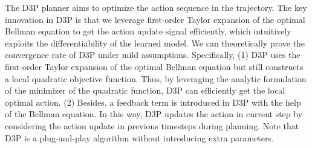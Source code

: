 \documentclass{article} %
\begin{document}
The D3P planner aims to optimize the action sequence in the trajectory. The key innovation in D3P is that we leverage first-order Taylor expansion of the optimal Bellman equation to get the action update signal efficiently, which intuitively exploits the differentiability of the learned model. We can theoretically prove the convergence rate of D3P under mild assumptions. 
Specifically, (1) D3P uses the first-order Taylor expansion of the optimal Bellman equation but still constructs a local quadratic objective function. Thus, by leveraging the analytic formulation of the minimizer of the quadratic function, D3P can efficiently get the local optimal action. 
(2) Besides, a feedback term is introduced in D3P with the help of the Bellman equation. In this way, D3P updates the action in current step by considering the action update in previous timesteps during planning. 
Note that D3P is a plug-and-play algorithm without introducing extra parameters.


\end{document}
